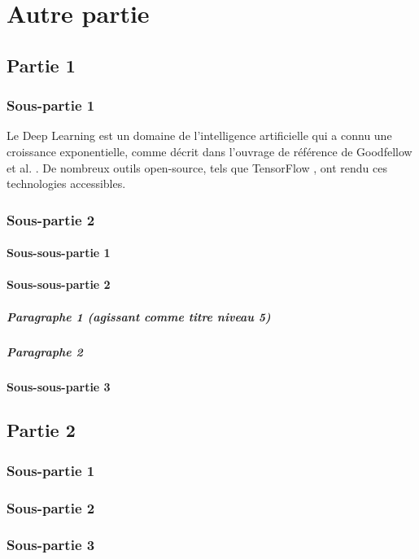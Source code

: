 \section{Autre partie}
\label{chap:autre_partie}
\subsection{Partie 1}
\label{sec:autre_partie_1}

\subsubsection{Sous-partie 1}
\label{ssec:autre_partie_1_1}
Le Deep Learning est un domaine de l'intelligence artificielle qui a connu une croissance exponentielle, comme décrit dans l'ouvrage de référence de Goodfellow et al. \cite{goodfellow2016deep}. 
De nombreux outils open-source, tels que TensorFlow \cite{tensorflow2022}, ont rendu ces technologies accessibles.

\subsubsection{Sous-partie 2}
\label{ssec:autre_partie_1_2}
\paragraph{Sous-sous-partie 1}
\label{sssec:autre_partie_1_2_1}

\paragraph{Sous-sous-partie 2}
\label{sssec:autre_partie_1_2_2}
\subparagraph{Paragraphe 1 (agissant comme titre niveau 5)}

\subparagraph{Paragraphe 2}

\paragraph{Sous-sous-partie 3}
\label{sssec:autre_partie_1_2_3}

\subsection{Partie 2}
\label{sec:autre_partie_2}
\subsubsection{Sous-partie 1}
\label{ssec:autre_partie_2_1}

\subsubsection{Sous-partie 2}
\label{ssec:autre_partie_2_2}

\subsubsection{Sous-partie 3}
\label{ssec:autre_partie_2_3}

